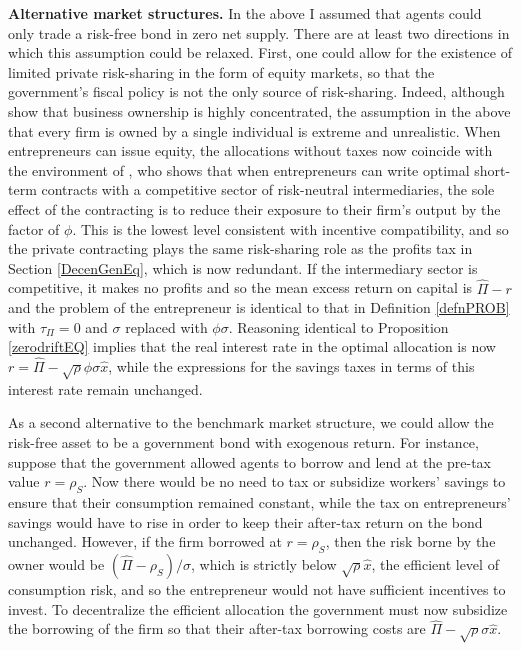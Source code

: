 \documentclass[11pt]{article}
\theoremstyle{plain}
\theoremstyle{definition} %
\begin{document}
\textbf{Alternative market structures.} In the above I assumed that agents could only trade a risk-free bond in zero net supply. There are at least two directions in which this assumption could be relaxed. First, one could allow for the existence of limited private risk-sharing in the form of equity markets, so that the government's fiscal policy is not the only source of risk-sharing. Indeed, although \cite{smith_capitalists_2019} show that business ownership is highly concentrated, the assumption in the above that every firm is owned by a single individual is extreme and unrealistic. When entrepreneurs can issue equity, the allocations without taxes now coincide with the environment of \cite{di_tella_uncertainty_2017}, who shows that when entrepreneurs can write optimal short-term contracts with a competitive sector of risk-neutral intermediaries, the sole effect of the contracting is to reduce their exposure to their firm's output by the factor of $\phi$. This is the lowest level consistent with incentive compatibility, and so the private contracting plays the same risk-sharing role as the profits tax in Section \ref{DecenGenEq}, which is now redundant. If the intermediary sector is competitive, it makes no profits and so the mean excess return on capital is $\hat{\Pi} - r$ and the problem of the entrepreneur is identical to that in Definition \ref{defnPROB} with $\tau_{\Pi} = 0$ and $\sigma$ replaced with $\phi \sigma$. Reasoning identical to Proposition \ref{zerodriftEQ} implies that the real interest rate in the optimal allocation is now $r = \hat{\Pi} - \sqrt{\rho} \phi \sigma \hat{x}$, while the expressions for the savings taxes in terms of this interest rate remain unchanged. 

As a second alternative to the benchmark market structure, we could allow the risk-free asset to be a government bond with exogenous return. For instance, suppose that the government allowed agents to borrow and lend at the pre-tax value $r = \rho_S$. Now there would be no need to tax or subsidize workers' savings to ensure that their consumption remained constant, while the tax on entrepreneurs' savings would have to rise in order to keep their after-tax return on the bond unchanged. However, if the firm borrowed at $r = \rho_S$, then the risk borne by the owner would be $(\hat{\Pi} - \rho_S)/\sigma$, which is strictly below $\sqrt{\rho} \hat{x}$, the efficient level of consumption risk, and so the entrepreneur would not have sufficient incentives to invest. To decentralize the efficient allocation the government must now subsidize the borrowing of the firm so that their after-tax borrowing costs are $\hat{\Pi} - \sqrt{\rho}\sigma\hat{x}$. 
\end{document}
